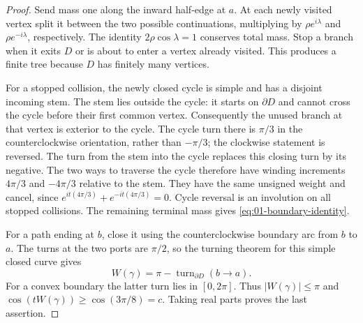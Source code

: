 \begin{proof}
Send mass one along the inward half-edge at $a$. At each newly visited
vertex split it between the two possible continuations, multiplying by
$\rho e^{i\lambda}$ and $\rho e^{-i\lambda}$, respectively. The identity
$2\rho\cos\lambda=1$ conserves total mass. Stop a branch when it exits
$D$ or is about to enter a vertex already visited. This produces a finite
tree because $D$ has finitely many vertices.

For a stopped collision, the newly closed cycle is simple and has a
disjoint incoming stem. The stem lies outside the cycle: it starts on
$\partial D$ and cannot cross the cycle before their first common
vertex. Consequently the unused branch at that vertex is exterior to
the cycle. The cycle turn there is $\pi/3$ in the counterclockwise
orientation, rather than $-\pi/3$; the clockwise statement is reversed.
The turn from the stem into the cycle replaces this closing turn by its
negative. The two ways to traverse the cycle therefore have winding
increments $4\pi/3$ and $-4\pi/3$ relative to the stem. They have the
same unsigned weight and cancel, since
$e^{it(4\pi/3)}+e^{-it(4\pi/3)}=0$. Cycle reversal is an involution on
all stopped collisions. The remaining terminal mass gives
\eqref{eq:01-boundary-identity}.

For a path ending at $b$, close it using the counterclockwise boundary
arc from $b$ to $a$. The turns at the two ports are $\pi/2$, so the
turning theorem for this simple closed curve gives
\[
 W(\gamma)=\pi-\operatorname{turn}_{\partial D}(b\to a).
\]
For a convex boundary the latter turn lies in $[0,2\pi]$. Thus
$|W(\gamma)|\le\pi$ and
$\cos(tW(\gamma))\ge\cos(3\pi/8)=c$.
Taking real parts proves the last assertion.
\end{proof}

